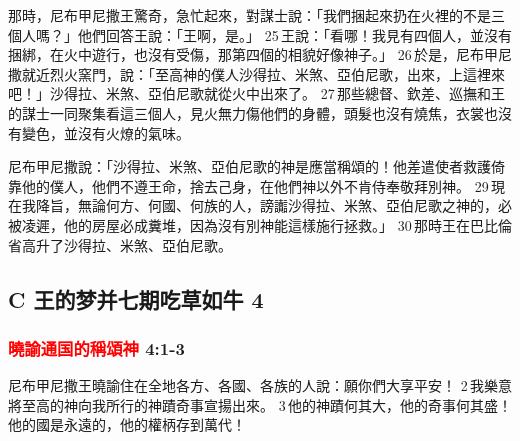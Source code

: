 那時，尼布甲尼撒王驚奇，急忙起來，對謀士說：「我們捆起來扔在火裡的不是三個人嗎？」他們回答王說：「王啊，是。」 25 王說：「看哪！我見有四個人，並沒有捆綁，在火中遊行，也沒有受傷，那第四個的相貌好像神子。」 26 於是，尼布甲尼撒就近烈火窯門，說：「至高神的僕人沙得拉、米煞、亞伯尼歌，出來，上這裡來吧！」沙得拉、米煞、亞伯尼歌就從火中出來了。 27 那些總督、欽差、巡撫和王的謀士一同聚集看這三個人，見火無力傷他們的身體，頭髮也沒有燒焦，衣裳也沒有變色，並沒有火燎的氣味。

尼布甲尼撒說：「沙得拉、米煞、亞伯尼歌的神是應當稱頌的！他差遣使者救護倚靠他的僕人，他們不遵王命，捨去己身，在他們神以外不肯侍奉敬拜別神。 29 現在我降旨，無論何方、何國、何族的人，謗讟沙得拉、米煞、亞伯尼歌之神的，必被凌遲，他的房屋必成糞堆，因為沒有別神能這樣施行拯救。」 30 那時王在巴比倫省高升了沙得拉、米煞、亞伯尼歌。

\subsection{C 王的梦并七期吃草如牛 4}
\subsubsection{\textcolor{red}{曉諭通国的稱頌神} 4:1-3}
尼布甲尼撒王曉諭住在全地各方、各國、各族的人說：願你們大享平安！ 2 我樂意將至高的神向我所行的神蹟奇事宣揚出來。 3 他的神蹟何其大，他的奇事何其盛！他的國是永遠的，他的權柄存到萬代！

